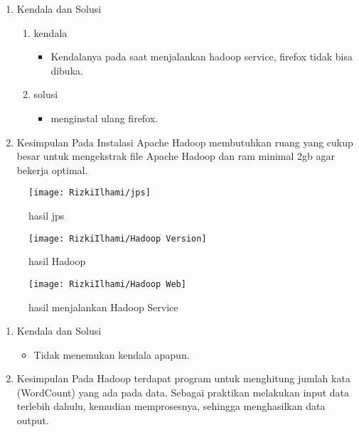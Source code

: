 

\begin{enumerate}

\item Kendala dan Solusi
\begin{enumerate}
    \item kendala
\begin{itemize}
    \item Kendalanya pada saat menjalankan hadoop service, firefox tidak bisa dibuka.
\end{itemize}
    \item solusi
\begin{itemize}
    \item menginstal ulang firefox.
\end{itemize}
\end{enumerate}

\item Kesimpulan
\newline
    Pada Instalasi Apache Hadoop membutuhkan ruang yang
    cukup besar untuk mengekstrak file Apache Hadoop dan ram
    minimal 2gb agar bekerja optimal.


\end{enumerate}

\begin{figure}[!ht]
    \texttt{[image: RizkiIlhami/jps]}
    \caption{hasil jps}
    \label{gam:Hasil}
\end{figure}

\begin{figure}[!ht]
    \texttt{[image: RizkiIlhami/Hadoop Version]}
    \caption{hasil Hadoop}
    \label{gam:Hasil}
\end{figure}

\begin{figure}[!ht]
    \texttt{[image: RizkiIlhami/Hadoop Web]}
    \caption{hasil menjalankan Hadoop Service}
    \label{gam:Hasil}
\end{figure}

\clearpage
{}
\begin{enumerate}
\item Kendala dan Solusi

\begin{itemize}
\item Tidak menemukan kendala apapun.
\end{itemize}

\item Kesimpulan
\newline
    Pada Hadoop terdapat program untuk menghitung jumlah kata 
    (WordCount) yang ada pada data. Sebagai praktikan melakukan input data terlebih
    dahulu, kemudian memprosesnya, sehingga menghasilkan data output.

\end{enumerate}

